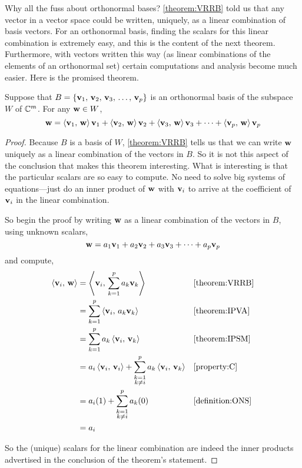 \documentclass{ximera}
\begin{document}
Why all the fuss about orthonormal bases?  \ref{theorem:VRRB} told us
that any vector in a vector space could be written, uniquely, as a
linear combination of basis vectors.  For an orthonormal basis,
finding the scalars for this linear combination is extremely easy, and
this is the content of the next theorem.  Furthermore, with vectors
written this way (as linear combinations of the elements of an
orthonormal set) certain computations and analysis become much easier.
Here is the promised theorem.

\begin{theorem}
  \label{theorem:COB}
  Suppose that $B=\left\{\mathbf{v}_{1},\,\mathbf{v}_{2},\,\mathbf{v}_{3},\,\ldots,\,\mathbf{v}_{p}\right\}$ is an orthonormal basis of
  the subspace $W$ of $\mathbb{C}^{m}$.  For any $\mathbf{w}\in W$,
  \[
    \mathbf{w}=
    \left\langle\mathbf{v}_1,\,\mathbf{w}\right\rangle\mathbf{v}_1+
    \left\langle\mathbf{v}_2,\,\mathbf{w}\right\rangle\mathbf{v}_2+
    \left\langle\mathbf{v}_3,\,\mathbf{w}\right\rangle\mathbf{v}_3+
    \cdots+
    \left\langle\mathbf{v}_p,\,\mathbf{w}\right\rangle\mathbf{v}_p
  \]

  \begin{proof}
    Because $B$ is a basis of $W$, \ref{theorem:VRRB} tells us that we
    can write $\mathbf{w}$ uniquely as a linear combination of the
    vectors in $B$.  So it is not this aspect of the conclusion that
    makes this theorem interesting.  What is interesting is that the
    particular scalars are so easy to compute.  No need to solve big
    systems of equations---just do an inner product of $\mathbf{w}$ with
    $\mathbf{v}_i$ to arrive at the coefficient of $\mathbf{v}_i$ in the
    linear combination.

    So begin the proof by writing $\mathbf{w}$ as a linear combination
    of the vectors in $B$, using unknown scalars,
    \[
      \mathbf{w}=a_{1}\mathbf{v}_{1}+a_{2}\mathbf{v}_{2}+a_{3}\mathbf{v}_{3}+\cdots +a_{p}\mathbf{v}_{p}
    \]
    and compute,
    \begin{align*}
      \left\langle\mathbf{v}_i,\,\mathbf{w}\right\rangle
      &=\left\langle\mathbf{v}_i,\,\sum_{k=1}^{p}a_k\mathbf{v}_k\right\rangle
      &&\ref{theorem:VRRB}\\
      &=\sum_{k=1}^{p}\left\langle\mathbf{v}_i,\,a_k\mathbf{v}_k\right\rangle
      &&\ref{theorem:IPVA}\\
      &=\sum_{k=1}^{p}a_k\left\langle\mathbf{v}_i,\,\mathbf{v}_k\right\rangle
      &&\ref{theorem:IPSM}\\
      &=a_i\left\langle\mathbf{v}_i,\,\mathbf{v}_i\right\rangle+
        \sum_{\substack{k=1\\k\neq i}}^{p}a_k\left\langle\mathbf{v}_i,\,\mathbf{v}_k\right\rangle
      &&\ref{property:C}\\
      &=a_i(1)+\sum_{\substack{k=1\\k\neq i}}^{p}a_k(0)
      &&\ref{definition:ONS}\\
      &=a_i
    \end{align*}
    
    So the (unique) scalars for the linear combination are indeed the
    inner products advertised in the conclusion of the theorem's
    statement.
  \end{proof}
\end{theorem}
\end{document}
